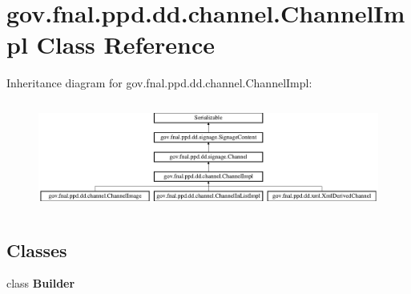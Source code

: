 \hypertarget{classgov_1_1fnal_1_1ppd_1_1dd_1_1channel_1_1ChannelImpl}{\section{gov.\-fnal.\-ppd.\-dd.\-channel.\-Channel\-Impl Class Reference}
\label{classgov_1_1fnal_1_1ppd_1_1dd_1_1channel_1_1ChannelImpl}
}
Inheritance diagram for gov.\-fnal.\-ppd.\-dd.\-channel.\-Channel\-Impl\-:\begin{figure}[H]
\begin{center}
\leavevmode
\includegraphics[height=3.589744cm]{classgov_1_1fnal_1_1ppd_1_1dd_1_1channel_1_1ChannelImpl}
\end{center}
\end{figure}
\subsection*{Classes}
\begin{DoxyCompactItemize}
\item 
class {\bfseries Builder}
\end{DoxyCompactItemize}
